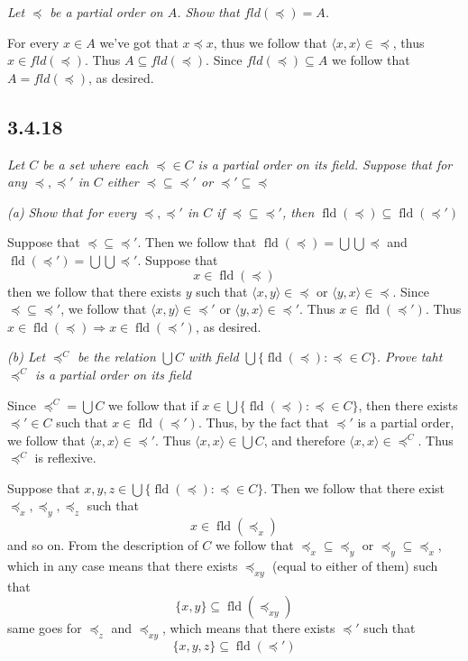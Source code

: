 \documentclass[11pt,oneside,titlepage]{book}
\DeclareMathOperator \fld {fld}
\DeclareMathOperator \ra {\Rightarrow}
\newcommand{\eangle}[1]{\langle #1 \rangle}
\begin{document}
\textit{Let $\preceq$ be a partial order on $A$. Show that $fld(\preceq) = A$.}

For every $x \in A$ we've got that 
$x \preceq x$, thus we follow that $\eangle{x, x} \in \preceq$, thus $x \in fld(\preceq)$.
Thus $A \subseteq fld(\preceq)$. Since $fld(\preceq) \subseteq A$
we follow that $A = fld(\preceq)$, as desired.

\subsection*{3.4.18}

\textit{Let $C$ be a set where each $\preceq \in C$ is a partial order on its field.
  Suppose that for any $\preceq, \preceq'$ in $C$ either $\preceq \subseteq \preceq'$
  or $\preceq' \subseteq \preceq$}

\textit{(a) Show that for every $\preceq, \preceq'$ in $C$ if $\preceq \subseteq \preceq'$,
  then $\fld(\preceq) \subseteq \fld(\preceq')$}

Suppose that $\preceq \subseteq \preceq'$. Then we follow that
$\fld(\preceq) = \bigcup \bigcup \preceq$ and
$\fld(\preceq') = \bigcup \bigcup \preceq'$. Suppose that
$$x \in \fld(\preceq)$$
then we follow that there exists $y$ such that  $\eangle{x, y} \in \preceq$ or
$\eangle{y, x} \in \preceq$. Since $\preceq \subseteq \preceq'$, we follow
that $\eangle{x, y} \in \preceq'$ or $\eangle{y, x} \in \preceq'$. Thus
$x \in \fld(\preceq')$. Thus $x \in \fld(\preceq) \ra x \in \fld(\preceq')$,
as desired.

\textit{(b) Let $\preceq^C$ be the relation $\bigcup C$ with field
  $\bigcup\{\fld(\preceq): \preceq \in C\}$. Prove taht $\preceq^C$ is a partial order
  on its field}

Since $\preceq^C = \bigcup C$ we follow that if $x \in \bigcup\{\fld(\preceq): \preceq \in C\}$,
then there exists $\preceq' \in C$ such that $x \in \fld(\preceq')$. Thus, by
the fact that $\preceq'$ is a partial order, we follow that $\eangle{x, x} \in \preceq'$. Thus
$\eangle{x, x} \in \bigcup C$, and therefore $\eangle{x, x} \in \preceq^C$. Thus
$\preceq^C$ is reflexive.

Suppose that $x, y, z \in \bigcup\{\fld(\preceq): \preceq \in C\}$. Then we follow that
there exist $\preceq_x, \preceq_y, \preceq_z$ such that
$$x \in \fld(\preceq_x)$$
and so on. From the description of $C$ we follow that $\preceq_x \subseteq \preceq_y$
or $\preceq_y \subseteq \preceq_x$, which in any case means that there exists
$\preceq_{xy}$ (equal to either of them) such that
$$\{x, y\} \subseteq \fld(\preceq_{xy})$$
same goes for $\preceq_z$ and $\preceq_{xy}$, which means that there exists $\preceq'$ such that
$$\{x, y, z\} \subseteq \fld(\preceq')$$
\end{document}
